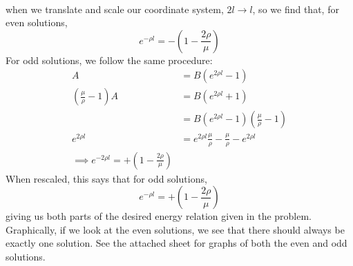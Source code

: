 \documentclass[a4paper,twoside]{article}
\begin{document}
\begin{itemize}
\begin{problem}
\begin{align}
        \end{align}
        when we translate and scale our coordinate system, $ 2l \to l $, so we find that, for even solutions,
        \begin{equation}
            e^{- \rho l} = -\left( 1 - \frac{2 \rho}{\mu} \right)
        \end{equation}
        For odd solutions, we follow the same procedure:
        \begin{align}
            A &= B\left( e^{2 \rho l} - 1 \right)\\
            \left( \frac{\mu}{\rho} - 1 \right)A &= B(e^{2 \rho l} + 1)\\
            &= B(e^{2 \rho l} - 1)\left( \frac{\mu}{\rho} - 1 \right)\\
            e^{2 \rho l} &= e^{2 \rho l} \frac{\mu}{\rho} - \frac{\mu}{\rho} - e^{2 \rho l}\\
            \implies e^{-2 \rho l} = +\left( 1 - \frac{2 \rho}{\mu} \right)
        \end{align}
        When rescaled, this says that for odd solutions,
        \begin{equation}
            e^{- \rho l} = +\left( 1 - \frac{2 \rho}{\mu} \right)
        \end{equation}
        giving us both parts of the desired energy relation given in the problem.
        Graphically, if we look at the even solutions, we see that there should always be exactly one solution. See the attached sheet for graphs of both the even and odd solutions.


\end{problem}
\end{itemize}
\end{document}
